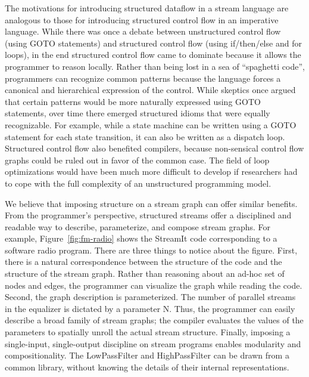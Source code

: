 
The motivations for introducing structured dataflow in a stream
language are analogous to those for introducing structured control
flow in an imperative language.  While there was once a debate between
unstructured control flow (using GOTO statements) and structured
control flow (using if/then/else and for loops), in the end structured
control flow came to dominate because it allows the programmer to
reason locally.  Rather than being lost in a sea of ``spaghetti
code'', programmers can recognize common patterns because the language
forces a canonical and hierarchical expression of the control.  While
skeptics once argued that certain patterns would be more naturally
expressed using GOTO statements, over time there emerged structured
idioms that were equally recognizable.  For example, while a state
machine can be written using a GOTO statement for each state
transition, it can also be written as a dispatch loop.  Structured
control flow also benefited compilers, because non-sensical control
flow graphs could be ruled out in favor of the common case.  The field
of loop optimizations would have been much more difficult to develop
if researchers had to cope with the full complexity of an unstructured
programming model.

We believe that imposing structure on a stream graph can offer similar
benefits.  From the programmer's perspective, structured streams offer
a disciplined and readable way to describe, parameterize, and compose
stream graphs.  For example, Figure~\ref{fig:fm-radio} shows the
StreamIt code corresponding to a software radio program.  There are
three things to notice about the figure.  First, there is a natural
correspondence between the structure of the code and the structure of
the stream graph.  Rather than reasoning about an ad-hoc set of nodes
and edges, the programmer can visualize the graph while reading the
code.  Second, the graph description is parameterized.  The number of
parallel streams in the equalizer is dictated by a parameter N.  Thus,
the programmer can easily describe a broad family of stream graphs;
the compiler evaluates the values of the parameters to spatially
unroll the actual stream structure.  Finally, imposing a single-input,
single-output discipline on stream programs enables modularity and
compositionality.  The LowPassFilter and HighPassFilter can be drawn
from a common library, without knowing the details of their internal
representations.


